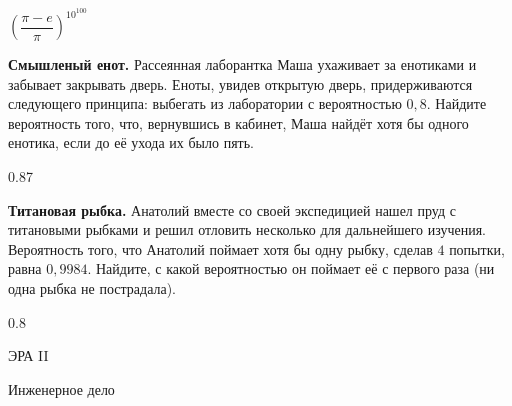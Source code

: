 \documentclass[12pt, addpoints]{exam} %
\begin{document}
\begin{questions}
\begin{solution}
$\left(\dfrac{\pi-e}{\pi}\right)^{10^{100}}$
\end{solution}

\question \textbf{Смышленый енот.} Рассеянная лаборантка Маша  ухаживает за енотиками и забывает закрывать дверь. Еноты, увидев открытую дверь,  придерживаются следующего принципа: выбегать из лаборатории с вероятностью $0,8$. Найдите вероятность того, что, вернувшись в кабинет, Маша найдёт хотя бы одного енотика, если до её ухода их было пять.

\begin{solution}
0.87
\end{solution}

\question \textbf{Титановая рыбка.} Анатолий вместе со своей экспедицией нашел пруд с титановыми рыбками и решил отловить несколько для дальнейшего изучения. Вероятность того, что Анатолий поймает хотя бы одну рыбку, сделав $4$ попытки, равна $0,9984$. Найдите, с какой вероятностью он поймает её с первого раза (ни одна рыбка не пострадала).
\begin{solution}
0.8
\end{solution}


\end{questions}



\newpage
\begin{center}
ЭРА II
\end{center}

\begin{center}
Инженерное дело
\end{center}
\end{document}
